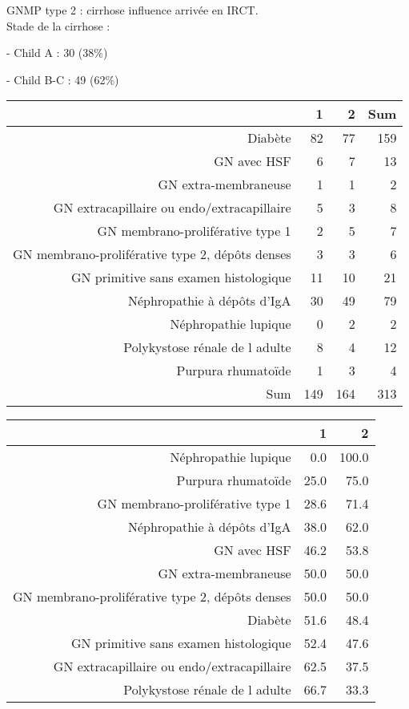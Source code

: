 \documentclass[11pt,a4paper]{article}\usepackage[]{graphicx}\usepackage[]{color}
\begin{document}
GNMP type 2 : cirrhose influence arrivée en IRCT.
~\\

Stade de la cirrhose :

- Child A : 30 (38\%)

- Child B-C : 49 (62\%)

\begin{table}[H]
\centering
\begin{tabular}{rrrr}
  \hline
 & 1 & 2 & Sum \\ 
  \hline
Diabète & 82 & 77 & 159 \\ 
  GN avec HSF & 6 & 7 & 13 \\ 
  GN extra-membraneuse & 1 & 1 & 2 \\ 
  GN extracapillaire ou endo/extracapillaire & 5 & 3 & 8 \\ 
  GN membrano-proliférative type 1 & 2 & 5 & 7 \\ 
  GN membrano-proliférative type 2, dépôts denses & 3 & 3 & 6 \\ 
  GN primitive sans examen histologique & 11 & 10 & 21 \\ 
  Néphropathie à dépôts d'IgA & 30 & 49 & 79 \\ 
  Néphropathie lupique & 0 & 2 & 2 \\ 
  Polykystose rénale de l adulte & 8 & 4 & 12 \\ 
  Purpura rhumatoïde & 1 & 3 & 4 \\ 
  Sum & 149 & 164 & 313 \\ 
   \hline
\end{tabular}
\end{table}
\begin{table}[H]
\centering
\begin{tabular}{rrr}
  \hline
 & 1 & 2 \\ 
  \hline
Néphropathie lupique & 0.0 & 100.0 \\ 
  Purpura rhumatoïde & 25.0 & 75.0 \\ 
  GN membrano-proliférative type 1 & 28.6 & 71.4 \\ 
  Néphropathie à dépôts d'IgA & 38.0 & 62.0 \\ 
  GN avec HSF & 46.2 & 53.8 \\ 
  GN extra-membraneuse & 50.0 & 50.0 \\ 
  GN membrano-proliférative type 2, dépôts denses & 50.0 & 50.0 \\ 
  Diabète & 51.6 & 48.4 \\ 
  GN primitive sans examen histologique & 52.4 & 47.6 \\ 
  GN extracapillaire ou endo/extracapillaire & 62.5 & 37.5 \\ 
  Polykystose rénale de l adulte & 66.7 & 33.3 \\ 
   \hline
\end{tabular}
\end{table}
\end{document}
